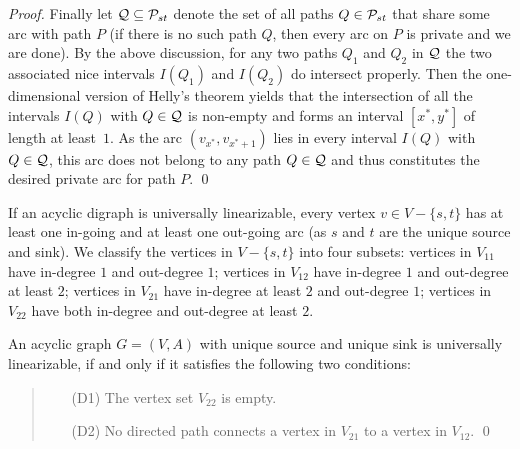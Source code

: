 \documentclass[runningheads]{llncs}
\begin{document}
\begin{proof}
Finally let ${\cal Q}\subseteq{\cal P}_{st}$ denote the set of all paths $Q\in{\cal P}_{st}$ that share some arc with path $P$
(if there is no such path $Q$, then every arc on $P$ is private and we are done).
By the above discussion, for any two paths $Q_1$ and $Q_2$ in ${\cal Q}$ the two associated nice 
intervals $I(Q_1)$ and $I(Q_2)$ do intersect properly.
Then the one-dimensional version of Helly's theorem \cite{Helly1923} yields that the intersection of all the 
intervals $I(Q)$ with $Q\in{\cal Q}$ is non-empty and forms an interval $[x^*,y^*]$ of length at least~$1$.
As the arc $(v_{x^*},v_{x^*+1})$ lies in every interval $I(Q)$ with $Q\in{\cal Q}$, this arc does 
not belong to any path $Q\in{\cal Q}$ and thus constitutes the desired private arc for path $P$.
\qed
\end{proof}

If an acyclic digraph is universally linearizable, every vertex $v\in V-\{s,t\}$ has at least 
one in-going and at least one out-going arc (as $s$ and $t$ are the unique source and sink).
We classify the vertices in $V-\{s,t\}$ into four subsets:
vertices in $V_{11}$ have in-degree $1$ and out-degree $1$;
vertices in $V_{12}$ have in-degree $1$ and out-degree at least $2$;
vertices in $V_{21}$ have in-degree at least $2$ and out-degree $1$;
vertices in $V_{22}$ have both in-degree and out-degree at least $2$.
\begin{lemma}
\label{le:D1D2}
An acyclic graph $G=(V,A)$ with unique source and unique sink is universally linearizable, 
if and only if it satisfies the following two conditions:
\begin{quote}
\begin{itemize}
\item[(D1)] The vertex set $V_{22}$ is empty.
\item[(D2)] No directed path connects a vertex in $V_{21}$ to a vertex in $V_{12}$. \qed
\end{itemize}
\end{quote}
\end{lemma}
\end{document}
